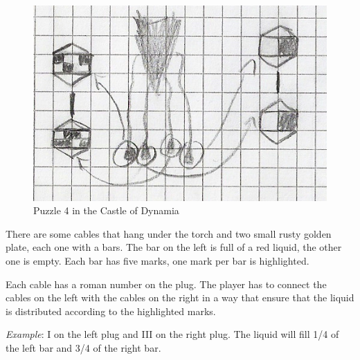 \begin{figure}[H]
  \centering
  \includegraphics[width=\textwidth]{Images/Puzzles/castleOfDynamia_4}
  \caption{Puzzle 4 in the Castle of Dynamia}
\end{figure}


There are some cables that hang under the torch and two small rusty golden plate, each one with a bars. The bar on the left is full of a red liquid, the other one is empty. Each bar has five marks, one mark per bar is highlighted.

Each cable has a roman number on the plug. The player has to connect the cables on the left with the cables on the right in a way that ensure that the liquid is distributed according to the highlighted marks.

\textit{Example}: I on the left plug and III on the right plug. The liquid will fill 1/4 of the left bar and 3/4 of the right bar.
